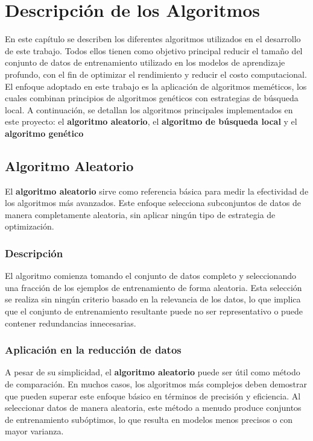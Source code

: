 \chapter{Descripción de los Algoritmos}\label{ch:descripcion-algoritmos}
En este capítulo se describen los diferentes algoritmos utilizados en el desarrollo de este trabajo.
Todos ellos tienen como objetivo principal reducir el tamaño del conjunto de datos de entrenamiento utilizado en los
modelos de aprendizaje profundo, con el fin de optimizar el rendimiento y reducir el costo computacional.
El enfoque adoptado en este trabajo es la aplicación de algoritmos meméticos, los cuales combinan principios de
algoritmos genéticos con estrategias de búsqueda local.
A continuación, se detallan los algoritmos principales implementados en este proyecto: el \textbf{algoritmo aleatorio},
el \textbf{algoritmo de búsqueda local} y el \textbf{algoritmo genético}

\section{Algoritmo Aleatorio}\label{sec:algoritmo-aleatorio}
El \textbf{algoritmo aleatorio} sirve como referencia básica para medir la efectividad de los algoritmos más avanzados.
Este enfoque selecciona subconjuntos de datos de manera completamente aleatoria, sin aplicar ningún tipo de estrategia
de optimización.

\subsection{Descripción}\label{subsec:descripcion}
El algoritmo comienza tomando el conjunto de datos completo y seleccionando una fracción de los ejemplos de
entrenamiento de forma aleatoria.
Esta selección se realiza sin ningún criterio basado en la relevancia de los datos, lo que implica que el conjunto de
entrenamiento resultante puede no ser representativo o puede contener redundancias innecesarias.

\subsection{Aplicación en la reducción de datos}\label{subsec:aplicacion-en-la-reduccion-de-datos}
A pesar de su simplicidad, el \textbf{algoritmo aleatorio} puede ser útil como método de comparación.
En muchos casos, los algoritmos más complejos deben demostrar que pueden superar este enfoque básico en términos de
precisión y eficiencia.
Al seleccionar datos de manera aleatoria, este método a menudo produce conjuntos de entrenamiento subóptimos, lo que
resulta en modelos menos precisos o con mayor varianza.

